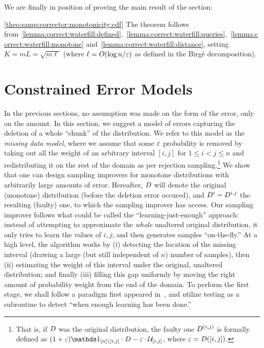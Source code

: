 \noindent We are finally in position of proving the main result of the section:
\begin{proofof}{\cref{theo:samp:corrector:monotonicity:cdf}}
The theorem follows from~\cref{lemma:correct:waterfill:defined},~\cref{lemma:correct:waterfill:queries},~\cref{lemma:correct:waterfill:monotone} and~\cref{lemma:correct:waterfill:distance}, setting $K=mL=\sqrt{m\ell}$ (where $\ell=\bigO{\log n/\eps}$ as defined in the Birg\'e decomposition).
\end{proofof}
\section{Constrained Error Models}\label{sec:specific:errors}
	In the previous sections, no assumption was made on the form of the error, only on the amount. 
In this section, we suggest a model of errors capturing the deletion of a whole ``chunk'' of the 
distribution. We refer to this model as the  \emph{missing data model}, where we assume that some $\varepsilon$ probability is removed by taking out all the weight of an arbitrary interval $[i,j]$ for $1\leq i<j\leq n$
and redistributing it on the rest of the domain as per rejection sampling.\footnote{ That is, if $D$ was the original distribution, 
the faulty one $D^{(i,j)}$ is formally defined as $(1+\eps)\indicSet{[n]\setminus[i,j]}\cdot\D - \eps\cdot\uniform_{[i,j]}$, where $\varepsilon=D([i,j])$.}
We show that one can design sampling improvers for monotone distributions
with arbitrarily large amounts of error. Hereafter, $D$ will denote the original (monotone) distribution (before the deletion error occured), and $D^\prime=D^{i,j}$ the resulting (faulty) one, to which the sampling improver has access.
Our sampling improver follows what could be called the ``learning-just-enough'' approach: instead of attempting to approximate the \emph{whole} unaltered original distribution, it only tries to learn the values of $i,j$; and then generates samples ``on-the-fly.'' At a high level, the algorithm works by \textsf{(i)} detecting the location of the missing interval (drawing a large (but still independent of $n$) number of samples), then \textsf{(ii)} estimating the weight of this interval under the original, unaltered distribution; and finally \textsf{(iii)} filling this gap uniformly by moving the right amount of probability weight from the end of the domain. To perform the first stage, we shall follow a paradigm first appeared in~\cite{DDS:12}, and utilize testing as a subroutine to detect ``when enough learning has been done.'' \medskip

